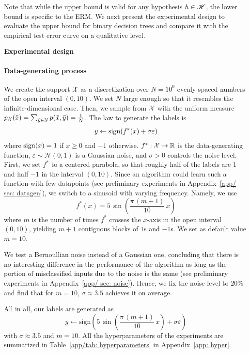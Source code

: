 \documentclass[reqno]{amsart}
\begin{document}
Note that while the upper bound is valid for any hypothesis $h\in\mathscr{H}$, the lower bound is specific to the ERM. We next present the experimental design to evaluate the upper bound for binary decision trees and compare it with the empirical test error curve on a qualitative level. 

{\bf Experimental design}

\paragraph{Data-generating process} We create the support $\mathcal X$ as a discretization over $N= 10^9$ evenly spaced numbers of the open interval $(0,10)$. We set $N$ large enough so that it resembles the infinite-dimensional case. Then, we sample from $\mathcal{X}$ with the uniform measure $p_{\mathcal{X}}(\bar x) = \sum_{\bar y\in \mathcal{Y}}p(\bar x, \bar y) = \frac{1}{N}$. 
The law to generate the labels is
\[
y \leftarrow \mathrm{sign}(f^*(x) + \sigma\varepsilon)
\] 
where $\mathrm{sign}(x) = 1$ if $x\ge 0$ and $-1$ otherwise. $f^*:\mathcal{X}\to\mathbb{R}$ is the data-generating function, $\varepsilon\sim\mathcal{N}(0,1)$ is a Gaussian noise, and $\sigma>0$ controls the noise level. 
First, we set $f^*$ to a centered parabola, so that roughly half of the labels are $1$ and half $-1$ in the interval $(0,10)$. 
Since an algorithm could learn such a function with few datapoints (see preliminary experiments in Appendix~\ref{app/ sec: datagen}), we switch to a sinusoid with varying frequency. Namely, we use
\begin{equation}\label{eq: sine}
    f^*(x) = 5\, \sin\left(\frac{\pi \,( m  +1)}{10}\, x\right)
\end{equation}
where $m$ is the number of times $f^*$ crosses the $x$-axis in the open interval $(0,10)$, yielding $m+1$ contiguous blocks of $1$s and $-1$s. 
We set as default value $m=10$.

We test a Bernoullian noise instead of a Gaussian one, concluding that there is no interesting difference in the performance of the algorithm as long as the portion of misclassified inputs due to the noise is the same (see preliminary experiments in Appendix~\ref{app/ sec: noise}). Hence, we fix the noise level to $20\%$ and find that for $m = 10$, $\sigma \approx 3.5$ achieves it on average. 

All in all, our labels are generated as
 \[
    y \leftarrow \mathrm{sign}\left(5\, \sin\left(\frac{\pi \,( m  +1)}{10}\, x\right) + \sigma\varepsilon\right)
 \]
 with $\sigma \approx 3.5$ and $m = 10$. All the hyperparameters of the experiments are summarized in Table~\ref{app/tab: hyperparameters} in Appendix~\ref{app: hyper}.
\end{document}
